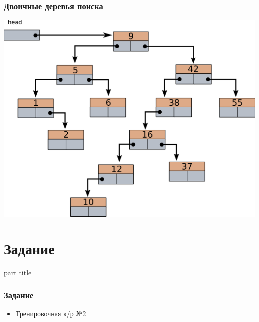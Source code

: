 \documentclass[14pt,pdf,hyperref={unicode}]{beamer}
\begin{document}
\begin{frame}[fragile]
\frametitle{Двоичные деревья поиска}  
\begin{center}
\includegraphics[width=0.75\linewidth]{images/bintree_search_1.png}
\end{center}
\end{frame}




\section{Задание}
\begin{frame}
\begin{center}
\begin{beamercolorbox}[sep=8pt,center]{part
title}
\insertsection
\end{beamercolorbox}
\end{center}
\end{frame}

\begin{frame}[fragile]
\frametitle{Задание} 
\begin{itemize}
\item Тренировочная к/р №2
\end{itemize}
\end{frame}
\end{document}
